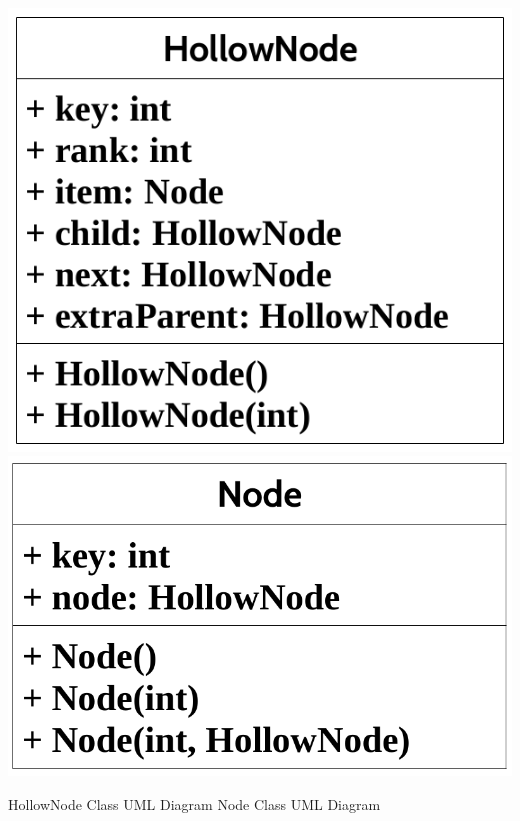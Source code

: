 \documentclass[letter,10pt]{article}
\begin{document}
\medskip
\phantom{helloworld}
\begin{center}
	\includegraphics[scale=.32]{hollownodeuml.png} \phantom{helloworld}	\includegraphics[scale=.24]{nodeuml.png}\\
\end{center}
\qquad \qquad HollowNode Class UML Diagram \phantom{helllloooooowoooorld} Node Class UML Diagram

\medskip
\end{document}

